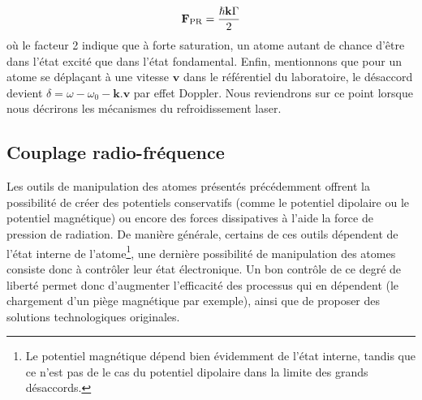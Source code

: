 \begin{equation}
\mathbf{F}_{\mathrm{PR}}=\frac{\hslash \mathbf{k} \Gamma}{2}
\end{equation}
où le facteur 2 indique que à forte saturation, un atome autant de chance d'être dans l'état excité que dans l'état fondamental. Enfin, mentionnons que pour un atome se déplaçant à une vitesse $\mathbf{v}$ dans le référentiel du laboratoire, le désaccord devient $\delta=\omega-\omega_0-\mathbf{k}.\mathbf{v}$ par effet Doppler. Nous reviendrons sur ce point lorsque nous décrirons les mécanismes du refroidissement laser.





\subsection{Couplage radio-fréquence} 
Les outils de manipulation des atomes présentés précédemment offrent la possibilité de créer des potentiels conservatifs (comme le potentiel dipolaire ou le potentiel magnétique) ou encore des forces dissipatives à l'aide la force de pression de radiation. De manière générale, certains de ces outils dépendent de l'état interne de l'atome\footnote{Le potentiel magnétique dépend bien évidemment de l'état interne, tandis que ce n'est pas de le cas du potentiel dipolaire dans la limite des grands désaccords.}, une dernière possibilité de manipulation des atomes consiste donc à contrôler leur état électronique. Un bon contrôle de ce degré de liberté permet donc d'augmenter l'efficacité des processus qui en dépendent (le chargement d'un piège magnétique par exemple), ainsi que de proposer des solutions technologiques originales. 

